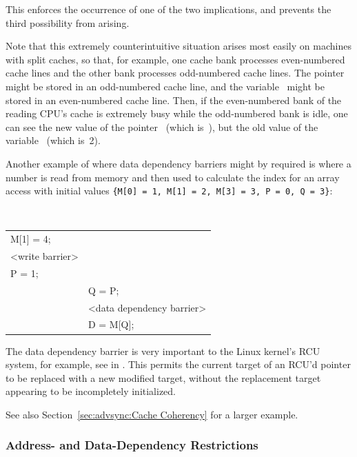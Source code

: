 This enforces the occurrence of one of the two implications, and prevents the
third possibility from arising.

Note that this extremely counterintuitive situation arises most easily on
machines with split caches, so that, for example, one cache bank processes
even-numbered cache lines and the other bank processes odd-numbered cache
lines.
The pointer~ might be stored in an odd-numbered cache line, and the
variable~ might be stored in an even-numbered cache line.  Then, if the
even-numbered bank of the reading CPU's cache is extremely busy while the
odd-numbered bank is idle, one can see the new value of the
pointer~ (which is~),
but the old value of the variable~ (which is~2).

Another example of where data dependency barriers might by required is where a
number is read from memory and then used to calculate the index for an array
access with initial values
{\tt \{M[0]~=~1, M[1]~=~2, M[3]~=~3, P~=~0, Q~=~3\}}:

\vspace{5pt}
\begin{minipage}[t]{\columnwidth}
\tt
\scriptsize
\begin{tabular}{l|p{1.5in}}
	\nf{CPU 1} &	\nf{CPU 2} \\
	\hline
	M[1] = 4; & \\
	<write barrier> & \\
	P = 1;	&	\\
		&	Q = P; \\
		&	<data dependency barrier> \\
		&	D = M[Q]; \\
\end{tabular}
\end{minipage}
\vspace{5pt}

The data dependency barrier is very important to the Linux kernel's
RCU system, for example,
see  in .
This permits the current
target of an RCU'd pointer to be replaced with a new modified target, without
the replacement target appearing to be incompletely initialized.

See also
Section~\ref{sec:advsync:Cache Coherency}
for a larger example.

\subsubsection{Address- and Data-Dependency Restrictions}
\label{sec:advsync:Address- and Data-Dependency Restrictions}

